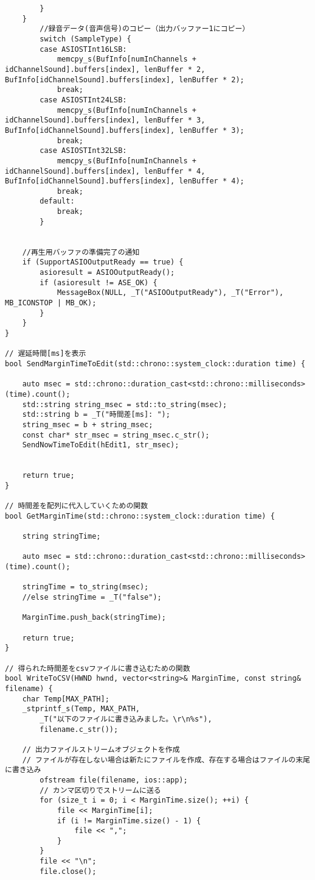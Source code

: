 \begin{verbatim}
		}
	}
		//録音データ(音声信号)のコピー（出力バッファー1にコピー）
		switch (SampleType) {
		case ASIOSTInt16LSB:
			memcpy_s(BufInfo[numInChannels + idChannelSound].buffers[index], lenBuffer * 2, BufInfo[idChannelSound].buffers[index], lenBuffer * 2);
			break;
		case ASIOSTInt24LSB:
			memcpy_s(BufInfo[numInChannels + idChannelSound].buffers[index], lenBuffer * 3, BufInfo[idChannelSound].buffers[index], lenBuffer * 3);
			break;
		case ASIOSTInt32LSB:
			memcpy_s(BufInfo[numInChannels + idChannelSound].buffers[index], lenBuffer * 4, BufInfo[idChannelSound].buffers[index], lenBuffer * 4);
			break;
		default:
			break;
		}
	

	//再生用バッファの準備完了の通知
	if (SupportASIOOutputReady == true) {
		asioresult = ASIOOutputReady();
		if (asioresult != ASE_OK) {
			MessageBox(NULL, _T("ASIOOutputReady"), _T("Error"), MB_ICONSTOP | MB_OK);
		}
	}
}

// 遅延時間[ms]を表示
bool SendMarginTimeToEdit(std::chrono::system_clock::duration time) {

	auto msec = std::chrono::duration_cast<std::chrono::milliseconds>(time).count();
	std::string string_msec = std::to_string(msec);
	std::string b = _T("時間差[ms]: ");
	string_msec = b + string_msec;
	const char* str_msec = string_msec.c_str();
	SendNowTimeToEdit(hEdit1, str_msec);
	

	return true;
}

// 時間差を配列に代入していくための関数
bool GetMarginTime(std::chrono::system_clock::duration time) {

	string stringTime;

	auto msec = std::chrono::duration_cast<std::chrono::milliseconds>(time).count();
	
	stringTime = to_string(msec);
	//else stringTime = _T("false"); 

	MarginTime.push_back(stringTime);

	return true;
}

// 得られた時間差をcsvファイルに書き込むための関数
bool WriteToCSV(HWND hwnd, vector<string>& MarginTime, const string& filename) {
	char Temp[MAX_PATH];
	_stprintf_s(Temp, MAX_PATH,
		_T("以下のファイルに書き込みました。\r\n%s"),
		filename.c_str());

	// 出力ファイルストリームオブジェクトを作成
	// ファイルが存在しない場合は新たにファイルを作成、存在する場合はファイルの末尾に書き込み
		ofstream file(filename, ios::app);
		// カンマ区切りでストリームに送る
		for (size_t i = 0; i < MarginTime.size(); ++i) {
			file << MarginTime[i];
			if (i != MarginTime.size() - 1) {
				file << ",";
			}
		}
		file << "\n";
		file.close();


\end{verbatim}
